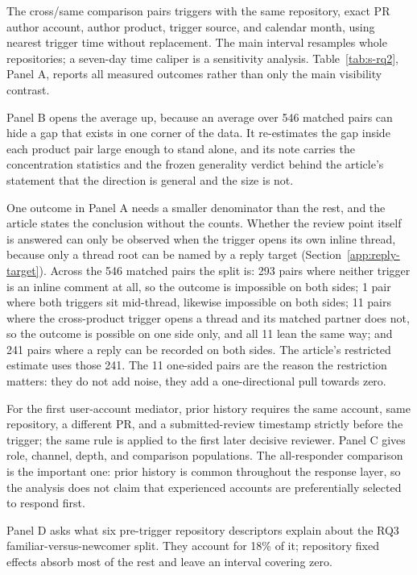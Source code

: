 \documentclass[pdflatex,sn-basic]{sn-jnl}
\begin{document}
The cross/same comparison pairs triggers with the same repository, exact PR
author account, author product, trigger source, and calendar month, using
nearest trigger time without replacement. The main interval resamples whole
repositories; a seven-day time caliper is a sensitivity analysis.
Table~\ref{tab:s-rq2}, Panel A, reports all measured outcomes rather than only
the main visibility contrast.

Panel B opens the average up, because an average over 546 matched pairs can hide
a gap that exists in one corner of the data. It re-estimates the gap inside each
product pair large enough to stand alone, and its note carries the concentration
statistics and the frozen generality verdict behind the article's statement that
the direction is general and the size is not.

One outcome in Panel A needs a smaller denominator than the rest, and the
article states the conclusion without the counts. Whether the review point itself
is answered can only be observed when the trigger opens its own inline thread,
because only a thread root can be named by a reply target
(Section~\ref{app:reply-target}). Across the 546 matched pairs the split is: 293
pairs where neither trigger is an inline comment at all, so the outcome is
impossible on both sides; 1 pair where both triggers sit mid-thread, likewise
impossible on both sides; 11 pairs where the cross-product trigger opens a thread
and its matched partner does not, so the outcome is possible on one side only,
and all 11 lean the same way; and 241 pairs where a reply can be recorded on both
sides. The article's restricted estimate uses those 241. The 11 one-sided pairs
are the reason the restriction matters: they do not add noise, they add a
one-directional pull towards zero.

For the first user-account mediator, prior history requires the same account,
same repository, a different PR, and a submitted-review timestamp strictly
before the trigger; the same rule is applied to the first later decisive
reviewer. Panel C gives role, channel, depth, and comparison populations. The
all-responder comparison is the important one: prior history is common
throughout the response layer, so the analysis does not claim that experienced
accounts are preferentially selected to respond first.

Panel D asks what six pre-trigger repository descriptors explain about the RQ3
familiar-versus-newcomer split. They account for 18\% of it; repository fixed
effects absorb most of the rest and leave an interval covering zero.
\end{document}
